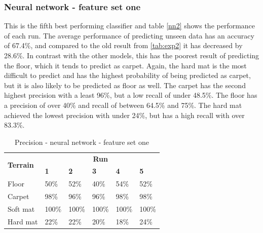 \documentclass[USenglish]{ifimaster}  %
\begin{document}
\subsubsection{Neural network - feature set one}
This is the fifth best performing classifier and table \ref{nn2} shows the performance of each run. The average performance of predicting unseen data has an accuracy of 67.4\%, and compared to the old result from \ref{tab:exp2} it has decreased by 28.6\%. In contrast with the other models, this has the poorest result of predicting the floor, which it tends to predict as carpet. Again, the hard mat is the most difficult to predict and has the highest probability of being predicted as carpet, but it is also likely to be predicted as floor as well. The carpet has the second highest precision with a least 96\%, but a low recall of under 48.5\%. The floor has a precision of over 40\% and recall of between 64.5\% and 75\%. The hard mat achieved the lowest precision with under 24\%, but has a high recall with over 83.3\%.
\begin{table}[h]
	\begin{subtable}[h]{1\textwidth}
		\centering
		\captionsetup{justification=centering}
		\begin{tabular}{@{}llllll@{}}
			\toprule
			\multirow{2}{*}{\textbf{Terrain}} & \multicolumn{5}{c}{\textbf{Run}} \\ \cmidrule(l){2-6} 
			& \multicolumn{1}{l|}{\textbf{1}} & \multicolumn{1}{l|}{\textbf{2}} & \multicolumn{1}{l|}{\textbf{3}} & \multicolumn{1}{l|}{\textbf{4}} & \textbf{5} \\ \midrule
			\multicolumn{1}{l|}{Floor} & \multicolumn{1}{l|}{50\%} & \multicolumn{1}{l|}{52\%} & \multicolumn{1}{l|}{40\%} & \multicolumn{1}{l|}{54\%} & 52\% \\ \midrule
			\multicolumn{1}{l|}{Carpet} & \multicolumn{1}{l|}{98\%} & \multicolumn{1}{l|}{96\%} & \multicolumn{1}{l|}{96\%} & \multicolumn{1}{l|}{98\%} & 98\% \\ \midrule
			\multicolumn{1}{l|}{Soft mat} & \multicolumn{1}{l|}{100\%} & \multicolumn{1}{l|}{100\%} & \multicolumn{1}{l|}{100\%} & \multicolumn{1}{l|}{100\%} & 100\% \\ \midrule
			\multicolumn{1}{l|}{Hard mat} & \multicolumn{1}{l|}{22\%} & \multicolumn{1}{l|}{22\%} & \multicolumn{1}{l|}{20\%} & \multicolumn{1}{l|}{18\%} & 24\% \\ \bottomrule
		\end{tabular}
		\caption{Precision - neural network - feature set one}
		\label{nnPrecision}
	\end{subtable}
\end{table}
\end{document}
